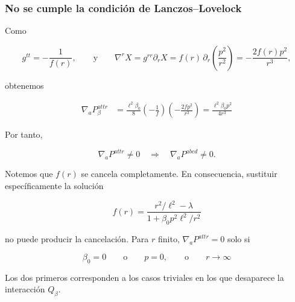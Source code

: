 \documentclass{beamer}
\newcommand{\CompactDisplaySpacing}{%
  \setlength{\abovedisplayskip}{2pt plus 1pt minus 1pt}%
  \setlength{\belowdisplayskip}{2pt plus 1pt minus 1pt}%
  \setlength{\abovedisplayshortskip}{0pt plus 1pt}%
  \setlength{\belowdisplayshortskip}{1pt plus 1pt}%
}
\begin{document}
\begin{frame}[label=nav-frame-120]
	\frametitle{No se cumple la condición de Lanczos--Lovelock}
\linespread{.96}\selectfont\CompactDisplaySpacing
	\scriptsize

	Como

	\[
	g^{tt}=-\frac{1}{f(r)},
	\qquad
	\text{y}
	\qquad
	\nabla^rX
	=
	g^{rr}\partial_rX
	=
	f(r)\,
	\partial_r\left(\frac{p^2}{r^2}\right)
	=
	-\frac{2f(r)p^2}{r^3},
	\]


	obtenemos

	\begin{align*}
		\nabla_aP_\beta^{attr}
		&=
		\frac{\ell^2\beta_0}{8}
		\left(-\frac1f\right)
		\left(-\frac{2fp^2}{r^3}\right)
		=
		\boxed{
			\frac{\ell^2\beta_0p^2}{4r^3}
		}
	\end{align*}

	Por tanto,

	\[
	\boxed{
		\nabla_aP^{attr}\neq0
		\quad\Longrightarrow\quad
		\nabla_aP^{abcd}\neq0.
	}
	\]


	Notemos que \(f(r)\) se cancela completamente. En consecuencia,
	sustituir específicamente la solución

	\[
	f(r)
	=
	\frac{
		r^2/\ell^2-\lambda
	}{
		1+\beta_0p^2\ell^2/r^2
	}
	\]

	no puede producir la cancelación. Para \(r\) finito, $\nabla_aP^{attr}=0$ solo si

	\[
	\boxed{
		\beta_0=0
		\qquad\text{o}\qquad
		p=0,
		\qquad\text{o}\qquad
		r\longrightarrow \infty
	}
	\]

	Los dos primeros corresponden a los casos triviales en los que desaparece
	la interacción \(Q_\beta\).

\end{frame}









\end{document}
